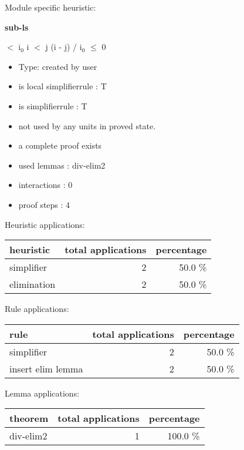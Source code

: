 \documentclass[a4paper]{article}
\begin{document}
Module specific heuristic:

\pagebreak

{\LARGE\bf sub-ls}\label{lemma-sub-ls}

\medskip

  $<$ $\mbox{i}_{0}$ \And i $<$ j \Imp (i - j) / $\mbox{i}_{0}$ $\le$ 0

\begin{itemize}

\item Type: created by user

\item is local simplifierrule : T
\item is simplifierrule : T
\item not used by any units in proved state.
\item       a complete proof exists
\item       used lemmas  : div-elim2
\item       interactions : 0
\item       proof steps  : 4
\end{itemize}

\medskip


Heuristic applications:

\begin{supertabular}{l|r|r}
heuristic	& total applications & percentage \\ \hline
simplifier & 2 & 50.0 \% \\
elimination & 2 & 50.0 \% \\

\end{supertabular}

Rule applications:

\begin{supertabular}{l|r|r}
rule	        & total applications & percentage \\ \hline
simplifier & 2 & 50.0 \% \\
insert elim lemma & 2 & 50.0 \% \\

\end{supertabular}

Lemma applications:

\begin{supertabular}{l|r|r}
theorem	        & total applications & percentage \\ \hline
div-elim2 & 1 & 100.0 \% \\

\end{supertabular}
\end{document}
